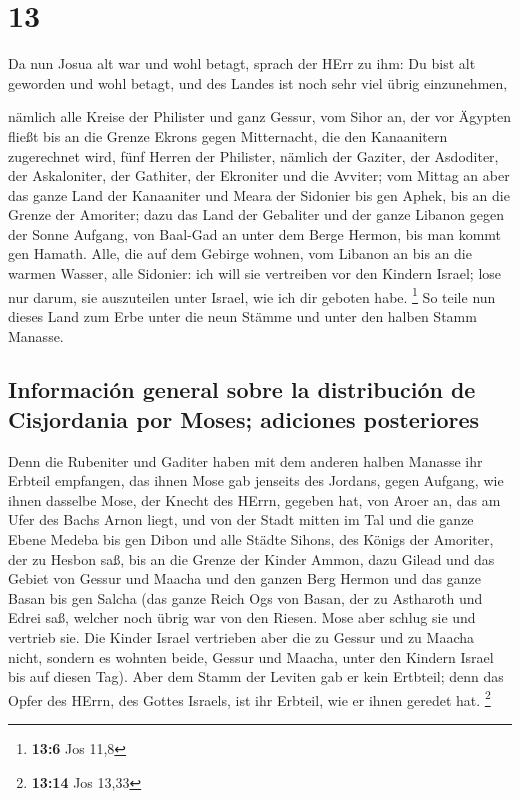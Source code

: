 \hypertarget{section-12}{%
\section{13}\label{section-12}}

 Da nun Josua alt war und wohl betagt, sprach der HErr zu
ihm: Du bist alt geworden und wohl betagt, und des Landes ist noch sehr
viel übrig einzunehmen,

 nämlich alle Kreise der Philister und ganz Gessur,
 vom Sihor an, der vor Ägypten fließt bis an die Grenze
Ekrons gegen Mitternacht, die den Kanaanitern zugerechnet wird, fünf
Herren der Philister, nämlich der Gaziter, der Asdoditer, der
Askaloniter, der Gathiter, der Ekroniter und die Avviter; 
vom Mittag an aber das ganze Land der Kanaaniter und Meara der Sidonier
bis gen Aphek, bis an die Grenze der Amoriter;  dazu das
Land der Gebaliter und der ganze Libanon gegen der Sonne Aufgang, von
Baal-Gad an unter dem Berge Hermon, bis man kommt gen Hamath.
 Alle, die auf dem Gebirge wohnen, vom Libanon an bis an
die warmen Wasser, alle Sidonier: ich will sie vertreiben vor den
Kindern Israel; lose nur darum, sie auszuteilen unter Israel, wie ich
dir geboten habe. \footnote{\textbf{13:6} Jos 11,8}  So
teile nun dieses Land zum Erbe unter die neun Stämme und unter den
halben Stamm Manasse.

\hypertarget{informaciuxf3n-general-sobre-la-distribuciuxf3n-de-cisjordania-por-moses-adiciones-posteriores}{%
\subsection{Información general sobre la distribución de Cisjordania por
Moses; adiciones
posteriores}\label{informaciuxf3n-general-sobre-la-distribuciuxf3n-de-cisjordania-por-moses-adiciones-posteriores}}

 Denn die Rubeniter und Gaditer haben mit dem anderen
halben Manasse ihr Erbteil empfangen, das ihnen Mose gab jenseits des
Jordans, gegen Aufgang, wie ihnen dasselbe Mose, der Knecht des HErrn,
gegeben hat,  von Aroer an, das am Ufer des Bachs Arnon
liegt, und von der Stadt mitten im Tal und die ganze Ebene Medeba bis
gen Dibon  und alle Städte Sihons, des Königs der
Amoriter, der zu Hesbon saß, bis an die Grenze der Kinder Ammon,
 dazu Gilead und das Gebiet von Gessur und Maacha und den
ganzen Berg Hermon und das ganze Basan bis gen Salcha 
(das ganze Reich Ogs von Basan, der zu Astharoth und Edrei saß, welcher
noch übrig war von den Riesen. Mose aber schlug sie und vertrieb sie.
 Die Kinder Israel vertrieben aber die zu Gessur und zu
Maacha nicht, sondern es wohnten beide, Gessur und Maacha, unter den
Kindern Israel bis auf diesen Tag).  Aber dem Stamm der
Leviten gab er kein Ertbteil; denn das Opfer des HErrn, des Gottes
Israels, ist ihr Erbteil, wie er ihnen geredet hat. \footnote{\textbf{13:14}
  Jos 13,33}

